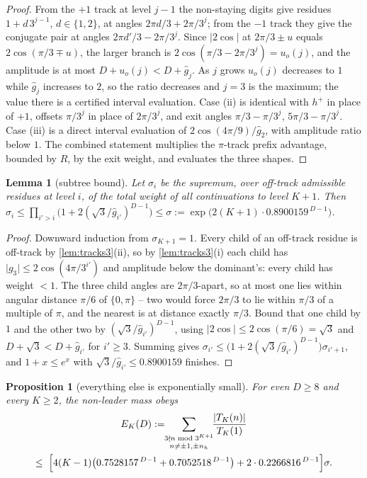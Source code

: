 \documentclass[11pt]{amsart}
\newtheorem{proposition}[theorem]{Proposition}
\newtheorem{lemma}[theorem]{Lemma}
\theoremstyle{definition}
\theoremstyle{remark}
\begin{document}
\begin{proof}
From the $+1$ track at level $j-1$ the non-staying digits give residues $1 + d\,3^{j-1}$, $d \in \{1,2\}$, at angles $2\pi d/3 + 2\pi/3^j$; from the $-1$ track they give the conjugate pair at angles $2\pi d'/3 - 2\pi/3^j$. Since $\lvert 2\cos\rvert$ at $2\pi/3 \pm u$ equals $2\cos(\pi/3 \mp u)$, the larger branch is $2\cos(\pi/3 - 2\pi/3^j) = u_o(j)$, and the amplitude is at most $D + u_o(j) < D + \hat g_j$. As $j$ grows $u_o(j)$ decreases to $1$ while $\hat g_j$ increases to $2$, so the ratio decreases and $j = 3$ is the maximum; the value there is a certified interval evaluation. Case (ii) is identical with $h^{+}$ in place of $+1$, offsets $\pi/3^j$ in place of $2\pi/3^j$, and exit angles $\pi/3 - \pi/3^j$, $5\pi/3 - \pi/3^j$. Case (iii) is a direct interval evaluation of $2\cos(4\pi/9)/\hat g_2$, with amplitude ratio below $1$. The combined statement multiplies the $\pi$-track prefix advantage, bounded by $R$, by the exit weight, and evaluates the three shapes.
\end{proof}

\begin{lemma}[subtree bound]
\label{lem:subtree3}
Let $\sigma_i$ be the supremum, over off-track admissible residues at level $i$, of the total weight of all continuations to level $K+1$. Then $\sigma_i \le \prod_{i' > i}\bigl(1 + 2(\sqrt3/\hat g_{i'})^{D-1}\bigr) \le \sigma := \exp\bigl(2(K+1)\cdot 0.8900159^{\,D-1}\bigr)$.
\end{lemma}

\begin{proof}
Downward induction from $\sigma_{K+1} = 1$. Every child of an off-track residue is off-track by \cref{lem:tracks3}(ii), so by \cref{lem:tracks3}(i) each child has $\lvert g_3 \rvert \le 2\cos(4\pi/3^{i'})$ and amplitude below the dominant's: every child has weight $< 1$. The three child angles are $2\pi/3$-apart, so at most one lies within angular distance $\pi/6$ of $\{0,\pi\}$ -- two would force $2\pi/3$ to lie within $\pi/3$ of a multiple of $\pi$, and the nearest is at distance exactly $\pi/3$. Bound that one child by $1$ and the other two by $(\sqrt3/\hat g_{i'})^{D-1}$, using $\lvert 2\cos\rvert \le 2\cos(\pi/6) = \sqrt3$ and $D + \sqrt3 < D + \hat g_{i'}$ for $i' \ge 3$. Summing gives $\sigma_{i'} \le \bigl(1 + 2(\sqrt3/\hat g_{i'})^{D-1}\bigr)\sigma_{i'+1}$, and $1+x \le e^x$ with $\sqrt3/\hat g_{i'} \le 0.8900159$ finishes.
\end{proof}

\begin{proposition}[everything else is exponentially small]
\label{prop:envelope3}
For even $D \ge 8$ and every $K \ge 2$, the non-leader mass obeys
\begin{multline*}
  E_K(D) := \!\!\sum_{\substack{3\nmid n \bmod 3^{K+1}\\ n \ne \pm1, \pm n_h}}\!\! \frac{\lvert T_K(n)\rvert}{T_K(1)} \\
  \le\; \Bigl[4(K-1)\bigl(0.7528157^{\,D-1} + 0.7052518^{\,D-1}\bigr) + 2\cdot 0.2266816^{\,D-1}\Bigr]\sigma .
\end{multline*}
\end{proposition}
\end{document}
